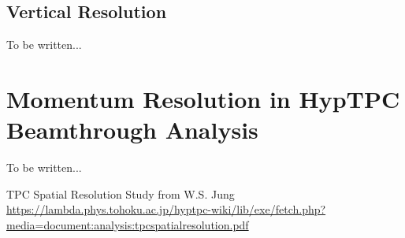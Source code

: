 \documentclass{article}
\begin{document}
	\subsection{Vertical Resolution}
	To be written...
	\section{Momentum Resolution in HypTPC Beamthrough Analysis}
	To be written...
	\begin{thebibliography}{}
		TPC Spatial Resolution Study from W.S. Jung\\
		\href{https://lambda.phys.tohoku.ac.jp/hyptpc-wiki/lib/exe/fetch.php?media=document:analysis:tpcspatialresolution.pdf}%
		{https://lambda.phys.tohoku.ac.jp/hyptpc-wiki/lib/exe/fetch.php?media=document:analysis:tpcspatialresolution.pdf}
	\end{thebibliography}
\end{document}
